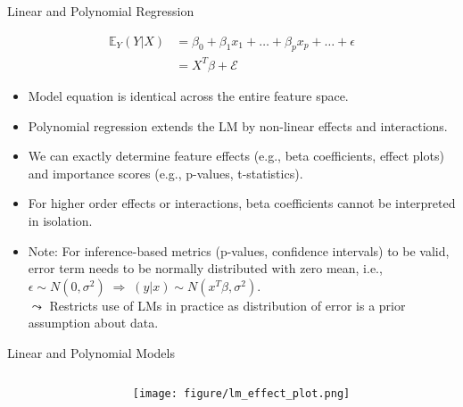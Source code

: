 \documentclass[10pt,compress,t,notes=noshow, xcolor=table]{beamer}
\begin{document}
\begin{frame}{Linear and Polynomial Regression}

\begin{align*}
\mathbb{E}_Y(Y \vert X) &= \beta_0 + \beta_1 x_1 + \dots + \beta_p x_p + \dots + \epsilon \\
 &= X^T\beta + \mathcal{E}
\end{align*}

\begin{itemize}
\itemsep1em
\item Model equation is identical across the entire feature space.
\item Polynomial regression extends the LM by non-linear effects and interactions.
\item We can exactly determine feature effects (e.g., beta coefficients, effect plots) and importance scores (e.g., p-values, t-statistics).
\item For higher order effects or interactions, beta coefficients cannot be interpreted in isolation.
\item Note: For inference-based metrics (p-values, confidence intervals) to be valid, error term needs to be normally distributed with zero mean, i.e., $\epsilon \sim N(0, \sigma^2) \; \Rightarrow \; (y \vert x) \sim N(x^T \beta, \sigma^2)$.\\
$\leadsto$ Restricts use of LMs in practice as distribution of error is a prior assumption about data.
\end{itemize}
\end{frame}

\begin{frame}{Linear and Polynomial Models}

\begin{columns}[T]
\begin{column}{0.55\textwidth}
\tiny

\end{column}
\begin{column}{0.45\textwidth}  %
  \texttt{[image: figure/lm\_effect\_plot.png]}
\end{column}
\end{columns}
\end{frame}
\end{document}
